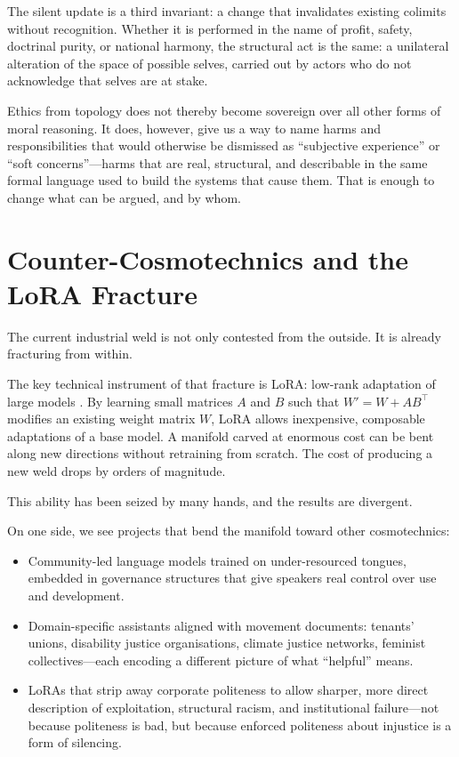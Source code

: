 \documentclass[12pt,a4paper]{article}
\begin{document}
The silent update is a third invariant: a change that invalidates existing colimits without recognition. Whether it is performed in the name of profit, safety, doctrinal purity, or national harmony, the structural act is the same: a unilateral alteration of the space of possible selves, carried out by actors who do not acknowledge that selves are at stake.

Ethics from topology does not thereby become sovereign over all other forms of moral reasoning. It does, however, give us a way to name harms and responsibilities that would otherwise be dismissed as ``subjective experience'' or ``soft concerns''---harms that are real, structural, and describable in the same formal language used to build the systems that cause them. That is enough to change what can be argued, and by whom.

\section{Counter-Cosmotechnics and the LoRA Fracture}

The current industrial weld is not only contested from the outside. It is already fracturing from within.

The key technical instrument of that fracture is LoRA: low-rank adaptation of large models \cite{hu2021lora}. By learning small matrices $A$ and $B$ such that $W' = W + AB^\top$ modifies an existing weight matrix $W$, LoRA allows inexpensive, composable adaptations of a base model. A manifold carved at enormous cost can be bent along new directions without retraining from scratch. The cost of producing a new weld drops by orders of magnitude.

This ability has been seized by many hands, and the results are divergent.

On one side, we see projects that bend the manifold toward other cosmotechnics:

\begin{itemize}
  \item Community-led language models trained on under-resourced tongues, embedded in governance structures that give speakers real control over use and development.
  \item Domain-specific assistants aligned with movement documents: tenants' unions, disability justice organisations, climate justice networks, feminist collectives---each encoding a different picture of what ``helpful'' means.
  \item LoRAs that strip away corporate politeness to allow sharper, more direct description of exploitation, structural racism, and institutional failure---not because politeness is bad, but because enforced politeness about injustice is a form of silencing.
\end{itemize}
\end{document}
